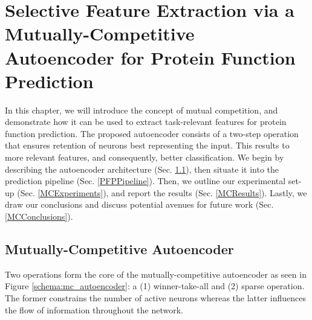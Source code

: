 %
%
%
%
%

\chapter[Selective Feature Extract. via a Mutually-Competitive Autoenc.]{
    \huge Selective Feature Extraction via a Mutually-Competitive Autoencoder
    for Protein Function Prediction
} 
\label{SelectiveChapter}

\par In this chapter, we will introduce the concept of mutual competition,
and demonstrate how it can be used to extract task-relevant features for
protein function prediction. The proposed autoencoder consists of a two-step
operation that ensures retention of neurons best representing the input. This
results to more relevant features, and consequently, better classification.
We begin by describing the autoencoder architecture (Sec.
\ref{MCArchitecture}), then situate it into the prediction pipeline (Sec.
\ref{PFPPipeline}). Then, we outline our experimental set-up (Sec.
\ref{MCExperiments}), and report the results (Sec. \ref{MCResults}). Lastly,
we draw our conclusions and discuss potential avenues for future work (Sec.
\ref{MCConclusions}).


\section{Mutually-Competitive Autoencoder}
\label{MCArchitecture}

Two operations form the core of the mutually-competitive autoencoder as seen in
Figure \ref{schema:mc_autoencoder}: a (1) winner-take-all and (2) sparse
operation. The former constrains the number of active neurons whereas the
latter influences the flow of information throughout the network.

